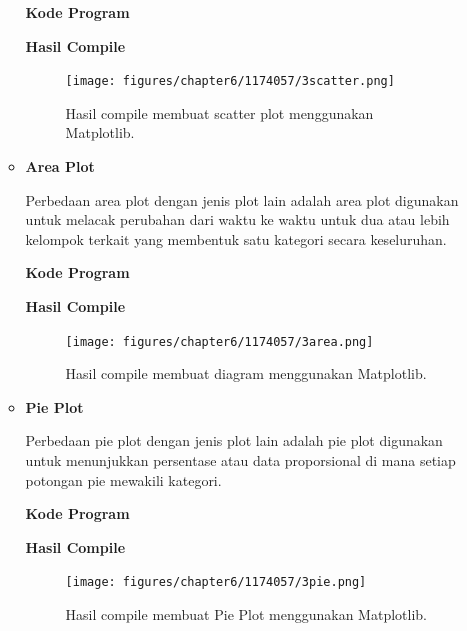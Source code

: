 \begin{enumerate}
\begin{itemize}
				\textbf{Kode Program}
				
				
				
				\textbf{Hasil Compile}
				
				\begin{figure}[H]
					\texttt{[image: figures/chapter6/1174057/3scatter.png]}
					\centering
					\caption{Hasil compile membuat scatter plot menggunakan Matplotlib.}
				\end{figure}
				
				\item \textbf{Area Plot}
				
				Perbedaan area plot dengan jenis plot lain adalah area plot digunakan untuk melacak perubahan dari waktu ke waktu untuk dua atau lebih kelompok terkait yang membentuk satu kategori secara keseluruhan.
				
				\textbf{Kode Program}
				
				
				
				\textbf{Hasil Compile}
				
				\begin{figure}[H]
					\texttt{[image: figures/chapter6/1174057/3area.png]}
					\centering
					\caption{Hasil compile membuat diagram menggunakan Matplotlib.}
				\end{figure}
				
				\item \textbf{Pie Plot}
				
				Perbedaan pie plot dengan jenis plot lain adalah pie plot digunakan untuk menunjukkan persentase atau data proporsional di mana setiap potongan pie mewakili kategori.
				
				\textbf{Kode Program}
				
				
				
				\textbf{Hasil Compile}
				
				\begin{figure}[H]
					\texttt{[image: figures/chapter6/1174057/3pie.png]}
					\centering
					\caption{Hasil compile membuat Pie Plot menggunakan Matplotlib.}
				\end{figure}
				

\end{itemize}
\end{enumerate}
